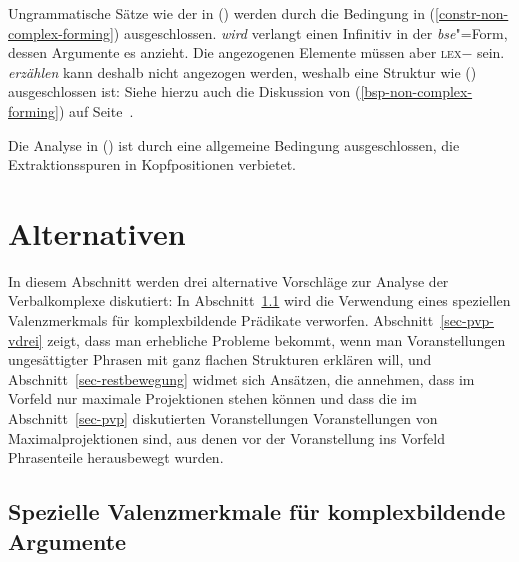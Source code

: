 Ungrammatische Sätze wie der in () werden durch die Bedingung
in (\ref{constr-non-complex-forming}) ausgeschlossen.
\z
\emph{wird} verlangt einen Infinitiv in der \emph{bse}"=Form, dessen Argumente
es anzieht. Die angezogenen Elemente müssen aber \textsc{lex}$-$ sein. \emph{erzählen}
kann deshalb nicht angezogen werden, weshalb eine Struktur wie () ausgeschlossen ist:
\z
Siehe hierzu auch die Diskussion von (\ref{bsp-non-complex-forming}) auf Seite~\pageref{bsp-non-complex-forming}.

Die Analyse in () ist durch eine allgemeine Bedingung ausgeschlossen,
die Extraktionsspuren in Kopfpositionen verbietet.
\z

\section{Alternativen}
\label{sec-alternativen}%

In diesem Abschnitt werden drei alternative Vorschläge zur Analyse der Verbalkomplexe diskutiert:
In Abschnitt~\ref{sec-vcomp} wird die Verwendung eines speziellen Valenzmerkmals für komplexbildende
Prädikate verworfen. Abschnitt~\ref{sec-pvp-vdrei} zeigt, dass man erhebliche Probleme bekommt,
wenn man Voranstellungen ungesättigter Phrasen mit ganz flachen Strukturen erklären will,
und Abschnitt~\ref{sec-restbewegung} widmet sich Ansätzen, die annehmen, dass im Vorfeld nur maximale
Projektionen stehen können und dass die im Abschnitt~\ref{sec-pvp} diskutierten Voranstellungen
Voranstellungen von Maximalprojektionen sind, aus denen vor der Voranstellung ins Vorfeld
Phrasenteile herausbewegt wurden.

\subsection{Spezielle Valenzmerkmale für komplexbildende Argumente}
\label{sec-vcomp}

